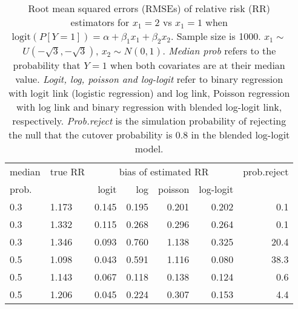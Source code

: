 \documentclass[12pt,a4paper]{article}
\begin{document}
\begin{table}[H] 
\small\sf\centering 
\caption{Root mean squared errors (RMSEs) of relative risk (RR) estimators for $x_1=2$ vs $x_1=1$ when $\mbox{logit}(P[Y=1])=\alpha+\beta_1 x_1 + \beta_2 x_2$. Sample size is 1000. $x_1 \sim $$U(-\sqrt{3},-\sqrt{3})$, $x_2 \sim N(0,1)$. {\it Median prob} refers to the probability that $Y=1$ when both covariates are at their median value. {\it Logit, log, poisson and log-logit} refer to binary regression with logit link (logistic regression) and log link, Poisson regression with log link and binary regression with blended log-logit link, respectively. {\it Prob.reject} is the simulation probability of rejecting the null that the cutover probability is $0.8$ in the blended log-logit model.} 
\begin{tabular}{llrrrrr} 
\toprule 
median & true RR & \multicolumn{4}{c}{bias of estimated RR} & prob.reject \\ 
prob. & & logit & log & poisson & log-logit  & \\ \midrule 
0.3 & 1.173 & 0.145 & 0.195 & 0.201 & 0.202 &  0.1 \\  
0.3 & 1.332 & 0.115 & 0.268 & 0.296 & 0.264 &  0.1 \\  
0.3 & 1.346 & 0.093 & 0.760 & 1.138 & 0.325 & 20.4 \\  
0.5 & 1.098 & 0.043 & 0.591 & 1.116 & 0.080 & 38.3 \\  
0.5 & 1.143 & 0.067 & 0.118 & 0.138 & 0.124 &  0.6 \\  
0.5 & 1.206 & 0.045 & 0.224 & 0.307 & 0.153 &  4.4 \\  
\bottomrule 
\end{tabular} 
\end{table} 
\end{document}
